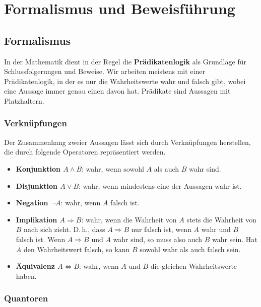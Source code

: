 
%
\section{Formalismus und Beweisf{\"u}hrung}
\subsection{Formalismus}

In der Mathematik dient in der Regel die \textbf{Pr{\"a}dikatenlogik} als Grundlage f{\"u}r Schlussfolgerungen und Beweise. Wir arbeiten meistens mit einer Pr{\"a}dikatenlogik, in der es nur die Wahrheitswerte {\glqq wahr\grqq} und {\glqq falsch\grqq} gibt, wobei eine Aussage immer genau einen davon hat. Pr{\"a}dikate sind Aussagen mit Platzhaltern.

\subsubsection{Verkn{\"u}pfungen}

Der Zusammenhang zweier Aussagen lässt sich durch Verknüpfungen herstellen, die durch folgende Operatoren repr{\"a}sentiert werden.
\begin{itemize}
\item	\textbf{Konjunktion $A\land B$}: wahr, wenn sowohl $A$ als auch $B$ wahr sind. 
\item \textbf{Disjunktion $A\lor B$}: wahr, wenn mindestens eine der Aussagen wahr ist. 
\item	\textbf{Negation $\neg A$}: wahr, wenn $A$ falsch ist. 
\item	\textbf{Implikation $A \Rightarrow B$}: wahr, wenn die Wahrheit von $A$ stets die Wahrheit von $B$ nach sich zieht. D.\,h., dass $A \Rightarrow B$ nur falsch ist, wenn $A$ wahr und $B$ falsch ist. Wenn $A \Rightarrow B$ und $A$ wahr sind, so muss also auch $B$ wahr sein. Hat $A$ den Wahrheitswert falsch, so kann $B$ sowohl wahr als auch falsch sein.
\item	\textbf{{\"A}quivalenz $A \Leftrightarrow B$}: wahr, wenn $A$ und $B$ die gleichen Wahrheitswerte haben.
\end{itemize}

\subsubsection{Quantoren}

